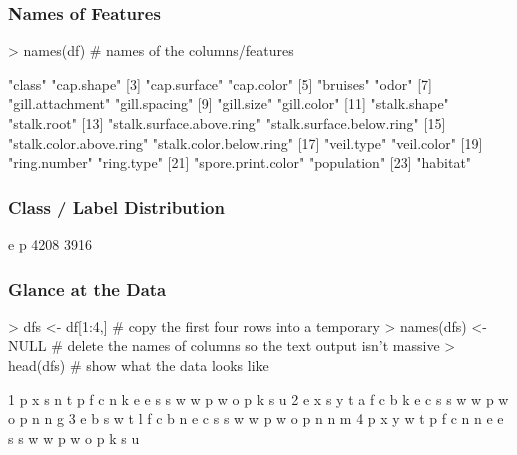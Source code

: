\documentclass[12pt]{article}         %
\begin{document}
\subsubsection{Names of Features}
\begin{Schunk}
\begin{Sinput}
> names(df) # names of the columns/features
\end{Sinput}
\begin{Soutput}
 [1] "class"                    "cap.shape"               
 [3] "cap.surface"              "cap.color"               
 [5] "bruises"                  "odor"                    
 [7] "gill.attachment"          "gill.spacing"            
 [9] "gill.size"                "gill.color"              
[11] "stalk.shape"              "stalk.root"              
[13] "stalk.surface.above.ring" "stalk.surface.below.ring"
[15] "stalk.color.above.ring"   "stalk.color.below.ring"  
[17] "veil.type"                "veil.color"              
[19] "ring.number"              "ring.type"               
[21] "spore.print.color"        "population"              
[23] "habitat"                 
\end{Soutput}
\end{Schunk}

\subsubsection{Class / Label Distribution}
\begin{Schunk}
\begin{Soutput}
   e    p 
4208 3916 
\end{Soutput}
\end{Schunk}


\subsubsection{Glance at the Data}
\begin{Schunk}
\begin{Sinput}
> dfs <- df[1:4,] # copy the first four rows into a temporary
> names(dfs) <- NULL # delete the names of columns so the text output isn't massive
> head(dfs) # show what the data looks like
\end{Sinput}
\begin{Soutput}
1 p x s n t p f c n k e e s s w w p w o p k s u
2 e x s y t a f c b k e c s s w w p w o p n n g
3 e b s w t l f c b n e c s s w w p w o p n n m
4 p x y w t p f c n n e e s s w w p w o p k s u
\end{Soutput}
\end{Schunk}
\end{document}
